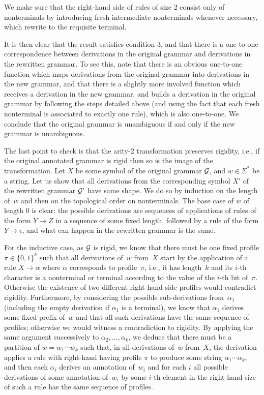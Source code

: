 We make sure that the right-hand side of rules of size 2 consist only of
nonterminals by introducing fresh intermediate nonterminals whenever
necessary, which rewrite to the requisite terminal.

%
%
%
It is then clear that the result satisfies condition 3, and that there is
a one-to-one correspondence between derivations in the original grammar and derivations in the rewritten grammar. To see this, note that there is an obvious one-to-one function which maps derivations from the original grammar into derivations in the new grammar, and that there is a slightly more involved function which receives a derivation in the new grammar, and builds a derivation in the original grammar by following the steps detailed above (and using the fact that each fresh nonterminal is associated to exactly one rule), which is also one-to-one. We conclude that the original grammar is unambiguous if and only if the new grammar is unambiguous.

%
The last point to check is that the arity-2 transformation preserves rigidity,
i.e., if the original annotated grammar is rigid then so is the image of the
transformation. Let $X$ be some symbol of the original grammar $\mathcal{G}$, and
$w \in \Sigma^*$ be a string. Let us show that all derivations from the
corresponding
symbol $X'$ of the rewritten grammar $\mathcal{G}'$ have same shape. We do so by
induction on the length of~$w$ and then on the topological order on
nonterminals. The base case of $w$ of length $0$ is clear: the possible
derivations are sequences of applications of rules of the form $Y \rightarrow Z$
in a sequence of some fixed length, followed by a rule of the form $Y
\rightarrow \epsilon$, and what can happen in the rewritten grammar is the same.

For the inductive case, as $\mathcal{G}$ is rigid, we know that there must be one
fixed profile $\pi \in \{0, 1\}^k$ such that all derivations of~$w$ from~$X$ start by the
application of a rule $X \rightarrow \alpha$ where $\alpha$ corresponds to
profile~$\pi$, i.e., it has length~$k$ and its $i$-th character is a nonterminal
or terminal according to the value of the $i$-th bit of~$\pi$.
Otherwise the existence of two different right-hand-side profiles would
contradict rigidity. Furthermore, by considering the possible sub-derivations
from~$\alpha_1$ (including the empty derivation if $\alpha_1$ is a terminal), we
know that $\alpha_1$ derives some fixed prefix of~$w$ and that all
such derivations have the same sequence of profiles; otherwise we would witness
a contradiction to rigidity. By applying the same argument successively to
$\alpha_2,
\ldots, \alpha_k$, we deduce
that there must be a partition of $w =
w_1 \cdots w_k$ such that, in all derivations of~$w$ from~$X$, the derivation
applies a rule with right-hand having profile $\pi$ to produce some string $\alpha_1 \cdots
\alpha_k$, and then each $\alpha_i$ derives an annotation of~$w_i$ and
for each $i$ all possible derivations of some annotation of~$w_i$ by some $i$-th
element in the right-hand size of such a rule has the same sequence of
profiles.

